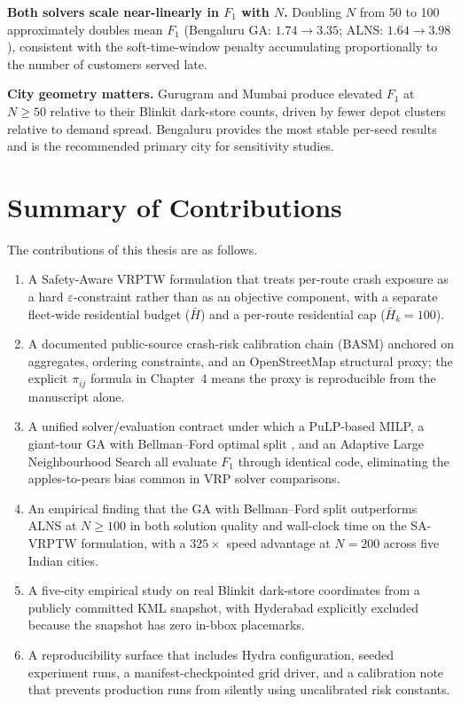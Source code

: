 \textbf{Both solvers scale near-linearly in $F_1$ with $N$.}
Doubling $N$ from 50 to 100 approximately doubles mean $F_1$
(Bengaluru GA: $1.74 \to 3.35$; ALNS: $1.64 \to 3.98$), consistent
with the soft-time-window penalty accumulating proportionally to the
number of customers served late.

\textbf{City geometry matters.} Gurugram and Mumbai produce elevated
$F_1$ at $N \geq 50$ relative to their Blinkit dark-store counts,
driven by fewer depot clusters relative to demand spread. Bengaluru
provides the most stable per-seed results and is the recommended
primary city for sensitivity studies.

\section{Summary of Contributions}

The contributions of this thesis are as follows.

\begin{enumerate}
    \item A Safety-Aware VRPTW formulation that treats per-route
    crash exposure as a hard $\varepsilon$-constraint rather than as
    an objective component, with a separate fleet-wide residential
    budget ($\bar{H}$) and a per-route residential cap
    ($\bar{H}_k = 100$).
    \item A documented public-source crash-risk calibration chain
    (BASM) anchored on \citet{morth2022} aggregates,
    \citet{mohan2017} ordering constraints, and an OpenStreetMap
    structural proxy; the explicit $\pi_{ij}$ formula in Chapter~4
    means the proxy is reproducible from the manuscript alone.
    \item A unified solver/evaluation contract under which a
    PuLP-based MILP, a giant-tour GA with Bellman--Ford optimal
    split \citep{prins2004}, and an Adaptive Large Neighbourhood
    Search \citep{ropke2006} all evaluate $F_1$ through identical
    code, eliminating the apples-to-pears bias common in VRP
    solver comparisons.
    \item An empirical finding that the GA with Bellman--Ford split
    outperforms ALNS at $N \geq 100$ in both solution quality and
    wall-clock time on the SA-VRPTW formulation, with a $325\times$
    speed advantage at $N = 200$ across five Indian cities.
    \item A five-city empirical study on real Blinkit dark-store
    coordinates from a publicly committed KML snapshot, with
    Hyderabad explicitly excluded because the snapshot has zero
    in-bbox placemarks.
    \item A reproducibility surface that includes Hydra
    configuration, seeded experiment runs, a manifest-checkpointed
    grid driver, and a calibration note that prevents production
    runs from silently using uncalibrated risk constants.
\end{enumerate}

